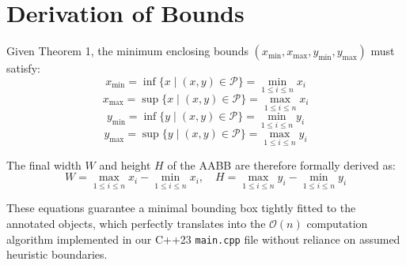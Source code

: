 \documentclass{article}
\begin{document}
\section*{Derivation of Bounds}

Given Theorem 1, the minimum enclosing bounds $(x_{\min}, x_{\max}, y_{\min}, y_{\max})$ must satisfy:
\[
x_{\min} = \inf \{x \mid (x,y) \in \mathcal{P}\} = \min_{1 \le i \le n} x_i
\]
\[
x_{\max} = \sup \{x \mid (x,y) \in \mathcal{P}\} = \max_{1 \le i \le n} x_i
\]
\[
y_{\min} = \inf \{y \mid (x,y) \in \mathcal{P}\} = \min_{1 \le i \le n} y_i
\]
\[
y_{\max} = \sup \{y \mid (x,y) \in \mathcal{P}\} = \max_{1 \le i \le n} y_i
\]

The final width $W$ and height $H$ of the AABB are therefore formally derived as:
\[
W = \max_{1 \le i \le n} x_i - \min_{1 \le i \le n} x_i, \quad H = \max_{1 \le i \le n} y_i - \min_{1 \le i \le n} y_i
\]

These equations guarantee a minimal bounding box tightly fitted to the annotated objects, which perfectly translates into the $\mathcal{O}(n)$ computation algorithm implemented in our C++23 \texttt{main.cpp} file without reliance on assumed heuristic boundaries.
\end{document}
